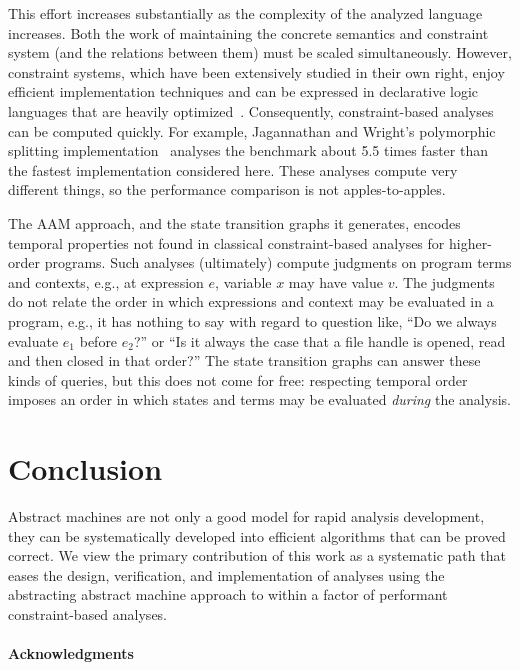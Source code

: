 \documentclass[9pt]{sigplanconf} %
\begin{document}
This effort increases substantially as the complexity of the analyzed language increases.
%
Both the work of maintaining the concrete semantics and constraint system (and the relations between them) must be scaled simultaneously.
%
However, constraint systems, which have been extensively studied in their own right, enjoy efficient implementation techniques and can be expressed in declarative logic languages that are heavily optimized~\cite{dvanhorn:bravenboer-smaragdakis-oopsla09}.
%
Consequently, constraint-based analyses can be computed quickly.
%
For example, Jagannathan and Wright's polymorphic splitting implementation~\cite{dvanhorn:wright-jagannathan-toplas98} analyses the \Church{} benchmark about 5.5 times faster than the fastest implementation considered here.
%
These analyses compute very different things, so the performance comparison is not apples-to-apples.

The AAM approach, and the state transition graphs it generates, encodes temporal properties not found in classical constraint-based analyses for higher-order programs.
%
Such analyses (ultimately) compute judgments on program terms and contexts, e.g., at expression $e$, variable $x$ may have value $v$.
%
The judgments do not relate the order in which expressions and context may be evaluated in a program, e.g., it has nothing to say with regard to question like,
%
``Do we always evaluate $e_1$ before $e_2$?'' or
%
``Is it always the case that a file handle is opened, read and then closed in that order?''
%
The state transition graphs can answer these kinds of queries, but this does not come for free: respecting temporal order imposes an order in which states and terms may be evaluated \emph{during} the analysis.

\section{Conclusion}
\label{sec:conclusion}

Abstract machines are not only a good model for rapid analysis development, they can be systematically developed into efficient algorithms that can be proved correct.
%
We view the primary contribution of this work as a systematic path that eases the design, verification, and implementation of analyses using the abstracting abstract machine approach to within a factor of performant constraint-based analyses.


\paragraph{Acknowledgments}
\end{document}
